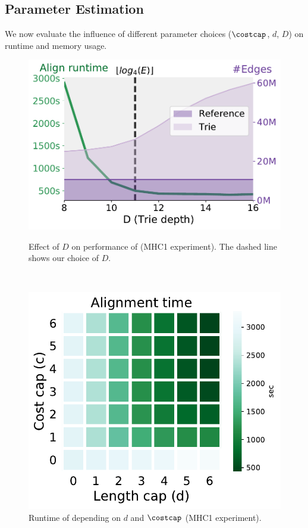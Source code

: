 \subsection{Parameter Estimation} \label{subsec:parameter_estimation}
We now evaluate the influence of different parameter choices ($\costcap$, $d$,
$D$) on runtime and memory usage.

\begin{figure}[H]
	\centering
	\begin{minipage}{0.48\linewidth}
		\centering
		\includegraphics[width=\linewidth]{figs/trie/MHC1-trie-vs-D.pdf}
		\caption[Effect of $D$ on performance of \astarix]{Effect of $D$ on performance of \astarix (MHC1 experiment). The dashed line shows our choice of $D$.}
		\label{fig:trie_vs_D}
	\end{minipage}~\hspace{0.7em}
	\begin{minipage}{0.49\linewidth}
		\centering
		\includegraphics[width=0.8\linewidth]{figs/heuristic/MHC1-heatmap-c_vs_d-align_sec.pdf}
		\caption[Runtime of \astarix depending on $d$ and $\costcap$]{Runtime of \astarix depending on $d$ and $\costcap$ (MHC1 experiment).}
		\label{fig:heuristic-parameters}
	\end{minipage}
\end{figure}

